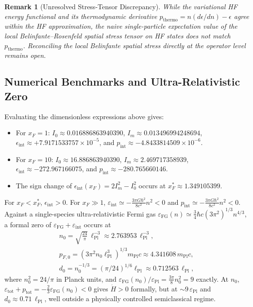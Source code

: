 \documentclass[11pt,a4paper]{article}
\newtheorem{remark}{Remark}
\begin{document}
\begin{remark}[Unresolved Stress-Tensor Discrepancy]
While the variational HF energy functional and its thermodynamic derivative $p_{\mathrm{thermo}} = n(d\epsilon/dn) - \epsilon$ agree within the HF approximation, the naive single-particle expectation value of the local Belinfante--Rosenfeld spatial stress tensor on HF states does not match $p_{\mathrm{thermo}}$. Reconciling the local Belinfante spatial stress directly at the operator level remains open.
\end{remark}

\subsection{Numerical Benchmarks and Ultra-Relativistic Zero}
Evaluating the dimensionless expressions above gives:
\begin{itemize}
\item For $x_F = 1$: $I_0 \approx 0.016886863940390$, $I_m \approx 0.013496994248694$, $\epsilon_{\mathrm{int}} \approx +7.9171533757 \times 10^{-5}$, and $p_{\mathrm{int}} \approx -4.8433814509 \times 10^{-6}$.
\item For $x_F = 10$: $I_0 \approx 16.886863940390$, $I_m \approx 2.469717358939$, $\epsilon_{\mathrm{int}} \approx -272.967166075$, and $p_{\mathrm{int}} \approx -280.765660146$.
\item The sign change of $\epsilon_{\mathrm{int}}(x_F) = 2I_m^2 - I_0^2$ occurs at $x_F^* \approx 1.349105399$.
\end{itemize}
For $x_F < x_F^*$, $\epsilon_{\mathrm{int}} > 0$. For $x_F \gg 1$, $\varepsilon_{\mathrm{int}} \simeq -\frac{3\pi G\hbar^2}{8c^2}n^2 < 0$ and $p_{\mathrm{int}} \simeq -\frac{3\pi G\hbar^2}{8c^2}n^2 < 0$. Against a single-species ultra-relativistic Fermi gas $\varepsilon_{\mathrm{FG}}(n) \simeq \frac{3}{4}\hbar c(3\pi^2)^{1/3}n^{4/3}$, a formal zero of $\varepsilon_{\mathrm{FG}} + \varepsilon_{\mathrm{int}}$ occurs at
\begin{gather}
n_0 = \sqrt{\frac{24}{\pi}}\,\ell_{\mathrm{Pl}}^{-3} \approx 2.763953\,\ell_{\mathrm{Pl}}^{-3}, \\ p_{F,0} = (3\pi^2 n_0\ell_{\mathrm{Pl}}^{3})^{1/3}m_{\mathrm{Pl}}c \approx 4.341608\,m_{\mathrm{Pl}}c, \\ d_0 = n_0^{-1/3} = (\pi/24)^{1/6}\ell_{\mathrm{Pl}} \approx 0.712563\,\ell_{\mathrm{Pl}},
\end{gather}
where $n_0^2 = 24/\pi$ in Planck units, and $\varepsilon_{\mathrm{FG}}(n_0)/\varepsilon_{\mathrm{Pl}} = \frac{3\pi}{8}n_0^2 = 9$ exactly. At $n_0$, $\varepsilon_{\mathrm{tot}} + p_{\mathrm{tot}} = -\frac{2}{3}\varepsilon_{\mathrm{FG}}(n_0) < 0$ gives $\dot{H} > 0$ formally, but at $\sim 9\,\varepsilon_{\mathrm{Pl}}$ and $d_0 \approx 0.71\,\ell_{\mathrm{Pl}}$, well outside a physically controlled semiclassical regime.
\end{document}
